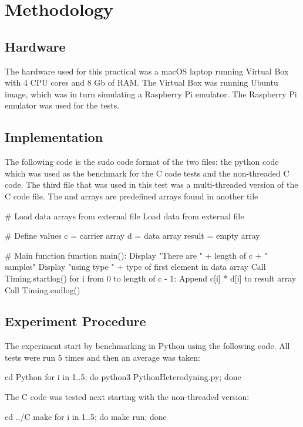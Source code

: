 \section{Methodology}

\subsection{Hardware}
The hardware used for this practical was a macOS laptop running Virtual Box with 4 CPU cores and 8 Gb of RAM. The Virtual Box was running Ubuntu image, which was in turn simulating a Raspberry Pi emulator. The Raspberry Pi emulator was used for the tests.

\subsection{Implementation}
The following code is the sudo code format of the two files: the python code which was used as the benchmark for the C code tests and the non-threaded C code.
The third file that was used in this test was a multi-threaded version of the C code file.
The  and  arrays are predefined arrays found in another tile

\begin{Cpp}
 # Load data arrays from external file
 Load data from external file

 # Define values
 c = carrier array
 d = data array
 result = empty array

 # Main function
 function main():
  Display "There are " + length of c + " samples"
  Display "using type " + type of first element in data array
  Call Timing.startlog()
  for i from 0 to length of c - 1:
  Append c[i] * d[i] to result array
  Call Timing.endlog()
\end{Cpp}

\subsection{Experiment Procedure}
The experiment start by benchmarking in Python using the following code.
All tests were run 5 times and then an average was taken:

\begin{Cpp}
 cd Python
 for i in {1..5}; do python3 PythonHeterodyning.py; done
\end{Cpp}

\newline
The C code was tested next starting with the non-threaded version:
\begin{Cpp}
 cd ../C
 make
 for i in {1..5}; do make run; done
\end{Cpp}

